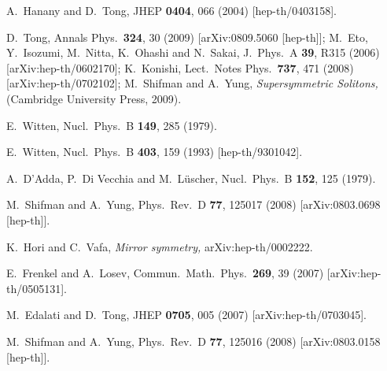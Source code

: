 \documentclass[epsfig,12pt]{article}
\begin{document}
{\begin{thebibliography}{99}
A.~Hanany and D.~Tong,
JHEP {\bf 0404}, 066 (2004)
[hep-th/0403158].

D.~Tong,
  Annals Phys.\  {\bf 324}, 30 (2009)
  [arXiv:0809.5060 [hep-th]];
  M.~Eto, Y.~Isozumi, M.~Nitta, K.~Ohashi and N.~Sakai,
  J.\ Phys.\ A  {\bf 39}, R315 (2006)
  [arXiv:hep-th/0602170];
  K.~Konishi,
  Lect.\ Notes Phys.\  {\bf 737}, 471 (2008)
  [arXiv:hep-th/0702102];
M.~Shifman and A.~Yung,
{\sl Supersymmetric Solitons,}
(Cambridge University Press, 2009).

E.~Witten,
Nucl.\ Phys.\ B {\bf 149}, 285 (1979).

E.~Witten,
  Nucl.\ Phys.\ B {\bf 403}, 159 (1993)
  [hep-th/9301042].
  
  A.~D'Adda, P.~Di Vecchia and M.~L\"{u}scher,
  Nucl.\ Phys.\  B {\bf 152}, 125 (1979).
  
  M.~Shifman and A.~Yung,
  Phys.\ Rev.\  D {\bf 77}, 125017 (2008)
  [arXiv:0803.0698 [hep-th]].
  
  K.~Hori and C.~Vafa,
{\em Mirror symmetry,}
  arXiv:hep-th/0002222.
  
E.~Frenkel and A.~Losev,
  Commun.\ Math.\ Phys.\  {\bf 269}, 39 (2007)
  [arXiv:hep-th/0505131].
  
 M.~Edalati and D.~Tong,
  JHEP {\bf 0705}, 005 (2007)
  [arXiv:hep-th/0703045].
  
  M.~Shifman and A.~Yung,
  Phys.\ Rev.\  D {\bf 77}, 125016 (2008)
  [arXiv:0803.0158 [hep-th]].
  

\end{thebibliography}}
\end{document}
